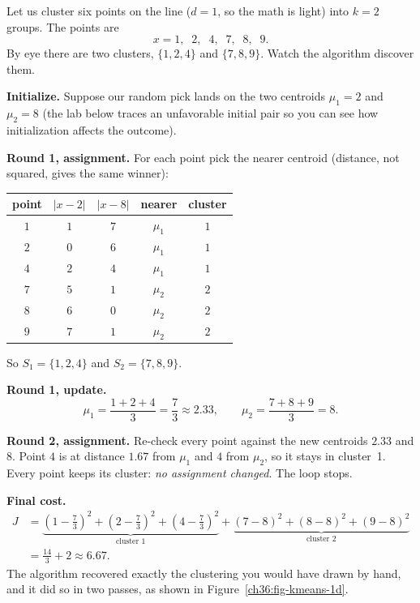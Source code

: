 Let us cluster six points on the line ($d=1$, so the math is light) into $k=2$
groups. The points are
\[
  x = 1,\;\; 2,\;\; 4,\;\; 7,\;\; 8,\;\; 9 .
\]
By eye there are two clusters, $\{1,2,4\}$ and $\{7,8,9\}$. Watch the algorithm
discover them.

\textbf{Initialize.} Suppose our random pick lands on the two centroids
$\mu_1 = 2$ and $\mu_2 = 8$ (the lab below traces an unfavorable initial pair
so you can see how initialization affects the outcome).

\textbf{Round 1, assignment.} For each point pick the nearer centroid (distance,
not squared, gives the same winner):

\begin{center}
\begin{tabular}{ccccc}
\toprule
point & $|x-2|$ & $|x-8|$ & nearer & cluster \\
\midrule
$1$ & $1$ & $7$ & $\mu_1$ & $1$ \\
$2$ & $0$ & $6$ & $\mu_1$ & $1$ \\
$4$ & $2$ & $4$ & $\mu_1$ & $1$ \\
$7$ & $5$ & $1$ & $\mu_2$ & $2$ \\
$8$ & $6$ & $0$ & $\mu_2$ & $2$ \\
$9$ & $7$ & $1$ & $\mu_2$ & $2$ \\
\bottomrule
\end{tabular}
\end{center}

So $S_1 = \{1,2,4\}$ and $S_2 = \{7,8,9\}$.

\textbf{Round 1, update.}
\[
  \mu_1 = \frac{1+2+4}{3} = \frac{7}{3} \approx 2.33,
  \qquad
  \mu_2 = \frac{7+8+9}{3} = 8 .
\]

\textbf{Round 2, assignment.} Re-check every point against the new centroids
$2.33$ and $8$. Point $4$ is at distance $1.67$ from $\mu_1$ and $4$ from
$\mu_2$, so it stays in cluster~1. Every point keeps its cluster: \emph{no
assignment changed}. The loop stops.

\textbf{Final cost.}
\begin{align*}
  J &= \underbrace{(1-\tfrac73)^2 + (2-\tfrac73)^2 + (4-\tfrac73)^2}_{\text{cluster 1}}
    + \underbrace{(7-8)^2 + (8-8)^2 + (9-8)^2}_{\text{cluster 2}} \\
    &= \tfrac{14}{3} + 2 \approx 6.67.
\end{align*}
The algorithm recovered exactly the clustering you would have drawn by hand,
and it did so in two passes, as shown in Figure~\ref{ch36:fig-kmeans-1d}.

